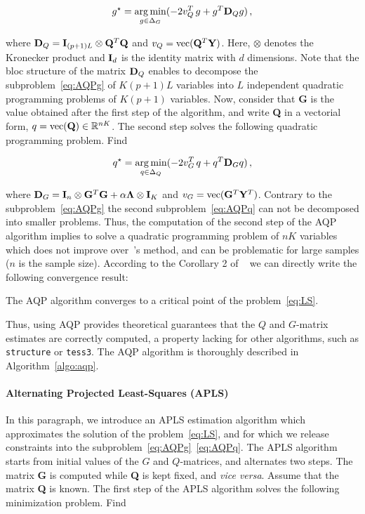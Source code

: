 \begin{equation}
\begin{aligned}
g^\star = \underset{g \in \Delta_G}{\arg \min}  ( -2  v^T_Q \, g + g^T {\bf D}_Q g ) \, ,  
\end{aligned}
\label{eq:AQPg}
\end{equation}

\noindent where ${\bf D}_Q = {\bf I}_{(p+1)L} \otimes {\bf Q}^T {\bf Q}$ and $v_Q = {\rm vec}({\bf Q}^T {\bf Y})$. Here, $\otimes$ denotes the Kronecker product and ${\bf I}_d$ is the identity matrix with $d$ dimensions. Note that the bloc structure of the matrix ${\bf D}_Q$ enables to decompose the subproblem~\ref{eq:AQPg} of $K(p + 1)L$ variables into $L$ independent quadratic programming problems of $K(p + 1)$ variables. Now, consider that {\bf G} is the value obtained after the first step of the algorithm, and write {\bf Q} in a vectorial form, $q = {\rm vec({\bf Q})} \in \mathbb{R}^{nK}$. The second step solves the following quadratic programming problem. Find

\begin{equation}
\begin{aligned}
q^\star = \underset{q \in \Delta_Q}{\arg \min} ( -2 v^T_G \, q + q^T {\bf D}_G q ) \,  ,
\end{aligned}
\label{eq:AQPq}
\end{equation}

\noindent where ${\bf D}_G = {\bf I}_{n} \otimes {\bf G}^T {\bf G } + \alpha {\bf \Lambda}  \otimes {\bf I}_K$ and $v_G = {\rm vec}({\bf G}^T{\bf  Y}^T)$. Contrary to the subproblem~\ref{eq:AQPg} the second subproblem~\ref{eq:AQPq} can not be decomposed into smaller problems. Thus, the computation of the second step of the AQP algorithm implies to solve a quadratic programming problem of $nK$ variables which does not improve over~\cite{Caye2016}'s method, and can be problematic for large samples ($n$ is the sample size). According to the Corollary 2 of ~\cite{Grippo2000} we can directly write the following convergence result:
\begin{thm}
	The AQP algorithm converges to a critical point of the problem~\ref{eq:LS}.
\end{thm}
Thus, using AQP provides theoretical guarantees that the $Q$ and $G$-matrix estimates are correctly computed, a property lacking for other algorithms, such as {\tt structure} or {\tt tess3}. The AQP algorithm is thoroughly described in Algorithm~\ref{algo:aqp}.

\paragraph{Alternating Projected Least-Squares (APLS)} In this paragraph, we introduce an APLS estimation algorithm which approximates the solution of the problem~\ref{eq:LS}, and for which we release constraints into the subproblem~\ref{eq:AQPg}~\ref{eq:AQPq}. The APLS algorithm starts from initial values of the $G$ and $Q$-matrices, and alternates two steps. The matrix {\bf G} is computed  while  {\bf Q} is kept fixed, and {\it vice versa}. Assume that the matrix {\bf Q} is known. The first step of the APLS algorithm solves the following minimization problem. Find 


